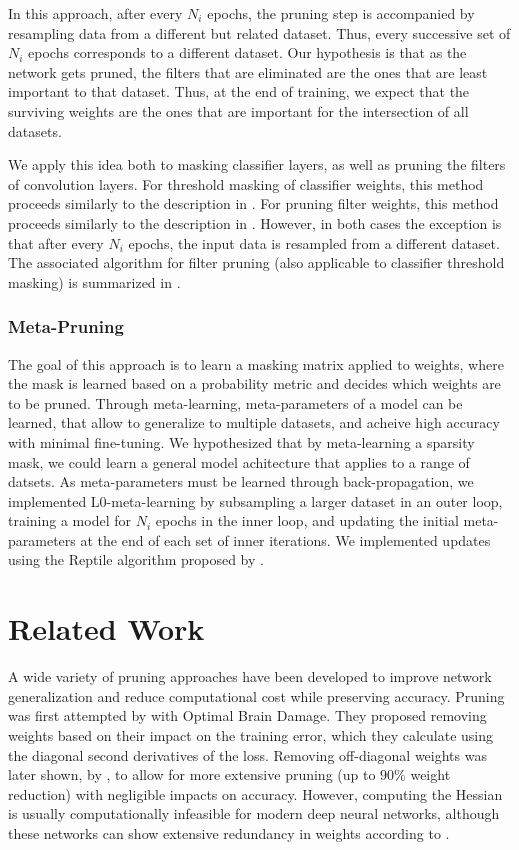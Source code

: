 \documentclass{article}
\begin{document}
In this approach, after every $N_i$ epochs, the pruning step is accompanied by resampling data from a different but related dataset. Thus, every successive set of $N_i$ epochs corresponds to a different dataset. Our hypothesis is that as the network gets pruned, the filters that are eliminated are the ones that are least important to that dataset. Thus, at the end of training, we expect that the surviving weights are the ones that are important for the intersection of all datasets.

We apply this idea both to masking classifier layers, as well as pruning the filters of convolution layers.
For threshold masking of classifier weights, this method proceeds similarly to the description in .
For pruning filter weights, this method proceeds similarly to the description in . However, in both cases the exception is that after every $N_i$ epochs, the input data is resampled from a different dataset. The associated algorithm for filter pruning (also applicable to classifier threshold masking) is summarized in .

\subsubsection{Meta-Pruning} \label{metaPruneClass}

The goal of this approach is to learn a masking matrix applied to weights, where the mask is learned based on a probability metric and decides which weights are to be pruned.
Through meta-learning, meta-parameters of a model can be learned, that allow to generalize to multiple datasets, and acheive high accuracy with minimal fine-tuning. We hypothesized that by meta-learning a sparsity mask, we could learn a general model achitecture that applies to a range of datsets. As meta-parameters must be learned through back-propagation, we implemented L0-meta-learning by subsampling a larger dataset in an outer loop, training a model for $N_i$ epochs in the inner loop, and updating the initial meta-parameters at the end of each set of inner iterations. We implemented updates using the Reptile algorithm proposed by \citet{reptile}.


\section{Related Work}

A wide variety of pruning approaches have been developed to improve network generalization and reduce computational cost while preserving accuracy. Pruning was first attempted by \citet{OBD} with Optimal Brain Damage. They proposed removing weights based on their impact on the training error, which they calculate using the diagonal second derivatives of the loss. Removing off-diagonal weights was later shown, by \citet{OBS}, to allow for more extensive pruning (up to $90$\% weight reduction) with negligible impacts on accuracy. However, computing the Hessian is usually computationally infeasible for modern deep neural networks, although these networks can show extensive redundancy in weights according to \citet{pred}.
\end{document}
